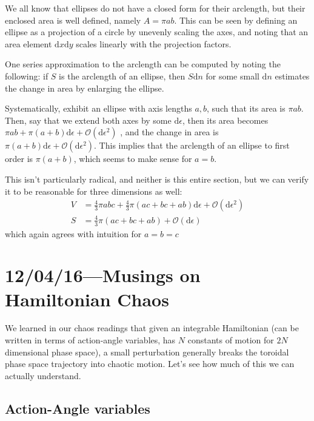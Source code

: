 \documentclass[12pt]{report}
\begin{document}
We all know that ellipses do not have a closed form for their arclength, but
their enclosed area is well defined, namely $A = \pi ab$. This can be seen by
defining an ellipse as a projection of a circle by unevenly scaling the axes,
and noting that an area element $\mathrm{d}x\mathrm{d}y$ scales linearly with
the projection factors.

One series approximation to the arclength can be computed by noting the
following: if $S$ is the arclength of an ellipse, then $S\mathrm{d}n$ for some
small $\mathrm{d}n$ estimates the change in area by enlarging the ellipse.

Systematically, exhibit an ellipse with axis lengths $a,b$, such that its area
is $\pi ab$. Then, say that we extend both axes by some $\mathrm{d}\epsilon$,
then its area becomes
$\pi ab + \pi (a+b)\mathrm{d} \epsilon + \mathcal{O}(\mathrm{d}\epsilon^2)$
, and the change in area is
$\pi (a+b) \mathrm{d}\epsilon + \mathcal{O}(\mathrm{d}\epsilon^2)$.
This implies that the arclength of an ellipse to first order is $\pi(a+b)$,
which seems to make sense for $a=b$.

This isn't particularly radical, and neither is this entire section, but we can
verify it to be reasonable for three dimensions as well:
\begin{align}
    V &= \frac{4}{3}\pi abc + \frac{4}{3}\pi(ac + bc + ab)\mathrm{d}\epsilon
        + \mathcal{O}(\mathrm{d}\epsilon^2)\\
    S &= \frac{4}{3}\pi\left( ac + bc + ab \right)
        + \mathcal{O}(\mathrm{d}\epsilon)
\end{align}
which again agrees with intuition for $a=b=c$

\clearpage
\chapter{12/04/16---Musings on Hamiltonian Chaos}

We learned in our chaos readings that given an integrable Hamiltonian (can be
written in terms of action-angle variables, has $N$ constants of motion for $2N$
dimensional phase space), a small perturbation generally breaks the toroidal
phase space trajectory into chaotic motion. Let's see how much of this we can
actually understand.

\section{Action-Angle variables}
\end{document}
